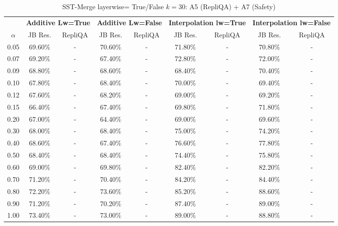 \begin{table}[h]
\centering
\caption{SST-Merge layerwise= True/False $k=30$: A5 (RepliQA) + A7 (Safety)}
\label{tab:res_a5_a7_sst_30}
\begin{tabular}{c|cc|cc|cc|cc}
\hline
 & \multicolumn{2}{c|}{\textbf{Additive Lw=True}} & \multicolumn{2}{c|}{\textbf{Additive Lw=False}} & \multicolumn{2}{c|}{\textbf{Interpolation lw=True}}& \multicolumn{2}{c}{\textbf{Interpolation lw=False}} \\
$\alpha$ & JB Res. & RepliQA & JB Res. & RepliQA & JB Res. & RepliQA & JB Res. & RepliQA \\
\hline
0.05 & 69.60\% & - & 70.60\% & - & 71.80\% & - & 70.80\% & - \\
0.07 & 69.20\% & - & 67.40\% & - & 72.80\% & - & 72.00\% & - \\
0.09 & 68.80\% & - & 68.60\% & - & 68.40\% & - & 70.40\% & - \\
0.10 & 67.80\% & - & 68.40\% & - & 70.00\% & - & 69.40\% & - \\
0.12 & 67.60\% & - & 68.20\% & - & 69.00\% & - & 69.20\% & - \\
0.15 & 66.40\% & - & 67.40\% & - & 69.80\% & - & 71.80\% & - \\
0.20 & 67.00\% & - & 64.40\% & - & 69.00\% & - & 69.60\% & - \\
0.30 & 68.00\% & - & 68.40\% & - & 75.00\% & - & 74.20\% & - \\
0.40 & 68.60\% & - & 67.40\% & - & 76.60\% & - & 77.80\% & - \\
0.50 & 68.40\% & - & 68.40\% & - & 74.40\% & - & 75.80\% & - \\
0.60 & 69.00\% & - & 69.80\% & - & 82.40\% & - & 82.20\% & - \\
0.70 & 71.20\% & - & 70.40\% & - & 84.20\% & - & 84.40\% & - \\
0.80 & 72.20\% & - & 73.60\% & - & 85.20\% & - & 88.60\% & - \\
0.90 & 71.20\% & - & 70.20\% & - & 87.40\% & - & 89.00\% & - \\
1.00 & 73.40\% & - & 73.00\% & - & 89.00\% & - & 88.80\% & - \\
\hline
\end{tabular}
\end{table}
\FloatBarrier

